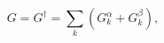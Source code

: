 \begin{equation}
G=G^{\dagger}=\sum_{k}\left( G_{k}^{\alpha }+G_{k}^{\beta }\right) , 
\label{gera}
\end{equation} 
